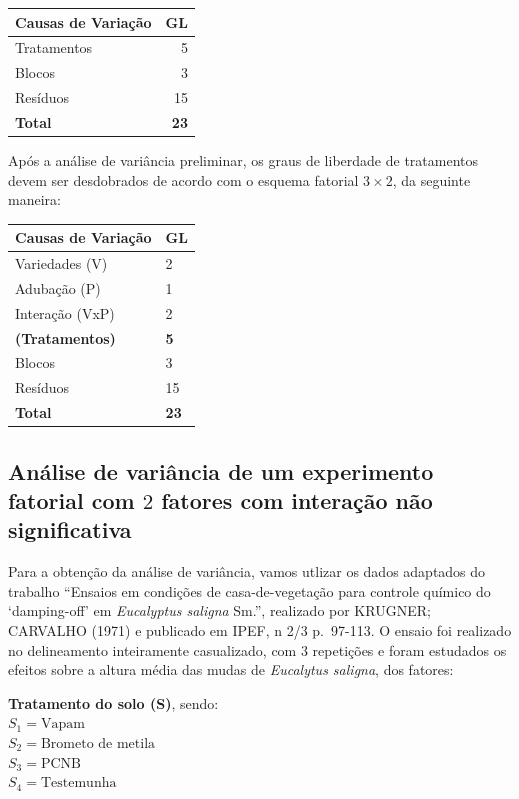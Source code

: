 \documentclass[
]{article}
\begin{document}
\begin{longtable}[t]{lr}
\toprule
Causas de Variação & GL\\
\midrule
Tratamentos & 5\\
Blocos & 3\\
Resíduos & 15\\
\textbf{Total} & \textbf{23}\\
\bottomrule
\end{longtable}

Após a análise de variância preliminar, os graus de liberdade de
tratamentos devem ser desdobrados de acordo com o esquema fatorial
\(3 \times 2\), da seguinte maneira:

\begin{longtable}[t]{ll}
\toprule
Causas de Variação & GL\\
\midrule
Variedades (V) & 2\\
Adubação (P) & 1\\
Interação (VxP) & 2\\
\textbf{(Tratamentos)} & \textbf{5}\\
Blocos & 3\\
\addlinespace
Resíduos & 15\\
\textbf{Total} & \textbf{23}\\
\bottomrule
\end{longtable}

\subsection{\texorpdfstring{Análise de variância de um experimento
fatorial com \(2\) fatores com interação não
significativa}{Análise de variância de um experimento fatorial com 2 fatores com interação não significativa}}\label{anuxe1lise-de-variuxe2ncia-de-um-experimento-fatorial-com-2-fatores-com-interauxe7uxe3o-nuxe3o-significativa}

Para a obtenção da análise de variância, vamos utlizar os dados
adaptados do trabalho ``Ensaios em condições de casa-de-vegetação para
controle químico do `damping-off' em \emph{Eucalyptus saligna} Sm.'',
realizado por KRUGNER; CARVALHO (1971) e publicado em IPEF, n 2/3
p.~97-113. O ensaio foi realizado no delineamento inteiramente
casualizado, com \(3\) repetições e foram estudados os efeitos sobre a
altura média das mudas de \emph{Eucalytus saligna}, dos fatores:

\textbf{Tratamento do solo (S)}, sendo:\\
\(S_1=\text{Vapam}\)\\
\(S_2=\text{Brometo de metila}\)\\
\(S_3=\text{PCNB}\)\\
\(S_4=\text{Testemunha}\)
\end{document}
